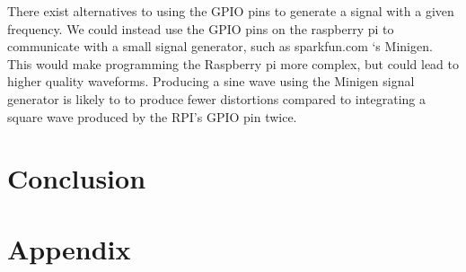 \documentclass{article}	%
\begin{document}
\begin{multicols}{2}
There exist alternatives to using the GPIO pins to generate a signal with a given frequency. We could instead use the GPIO pins on the raspberry pi to communicate with a small signal generator, such as sparkfun.com ‘s Minigen. This would make programming the Raspberry pi more complex, but could lead to higher quality waveforms. Producing a sine wave using the Minigen signal generator is likely to to produce fewer distortions compared to integrating a square wave produced by the RPI’s GPIO pin twice. 

\section{Conclusion}

\end{multicols}

\section{Appendix}
\end{document}
